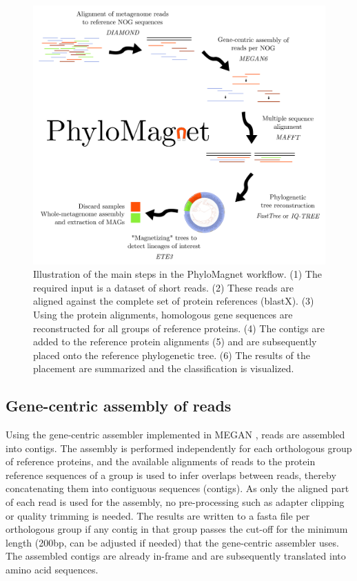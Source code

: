 \documentclass{bioinfo}
\begin{document}
\begin{methods}
\begin{figure}[!tpb]
\centerline{\includegraphics[width=.45\textwidth]{figures/Fig1.png}}
\caption{Illustration of the main steps in the PhyloMagnet workflow. (1) The required input is a dataset of short reads. (2) These reads are aligned against the complete set of protein references (blastX). (3) Using the protein alignments, homologous gene sequences are reconstructed for all groups of reference proteins. (4) The contigs are added to the reference protein alignments (5) and are subsequently placed onto the reference phylogenetic tree. (6) The results of the placement are summarized and the classification is visualized.}\label{fig:01}
\end{figure}


\subsection{Gene-centric assembly of reads}\label{gc-assembly}
Using the gene-centric assembler implemented in MEGAN \citep{Huson2016,Huson2017}, reads are assembled into contigs. The assembly is performed independently for each orthologous group of reference proteins, and the available alignments of reads to the protein reference sequences of a group is used to infer overlaps between reads, thereby concatenating them into contiguous sequences (contigs). As only the aligned part of each read is used for the assembly, no pre-processing such as adapter clipping or quality trimming is needed. The results are written to a fasta file per orthologous group if any contig in that group passes the cut-off for the minimum length (200bp, can be adjusted if needed) that the gene-centric assembler uses. The assembled contigs are already in-frame and are subsequently translated into amino acid sequences.


\end{methods}
\end{document}
